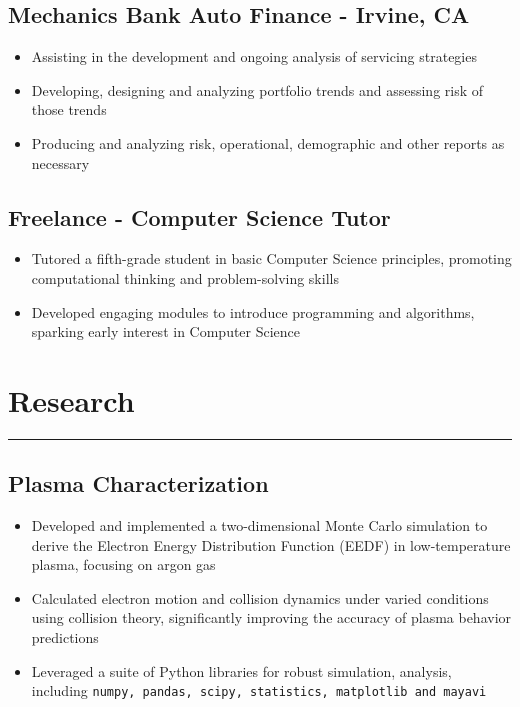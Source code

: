 \documentclass[11pt,a4paper]{article}
\newenvironment{myitemize}
{ \begin{itemize}[label={--}, leftmargin=*]
    \setlength{\itemsep}{0pt}
    \setlength{\parskip}{0pt}
    \setlength{\parsep}{0pt}     }
{ \end{itemize}                  }
\begin{document}
\subsection*{Mechanics Bank Auto Finance - Irvine, CA \hfill {} }

\begin{myitemize}
\item Assisting in the development and ongoing analysis of servicing strategies
\item Developing, designing and analyzing portfolio trends and assessing risk of those trends
\item Producing and analyzing risk, operational, demographic and other reports as necessary
\end{myitemize}


\subsection*{Freelance - Computer Science Tutor \hfill {} }

\begin{myitemize}
\item Tutored a fifth-grade student in basic Computer Science  principles, promoting computational thinking and problem-solving skills
\item Developed engaging modules to introduce programming and algorithms, sparking early interest in Computer Science
\end{myitemize}

\section*{Research}
\vspace{-3mm} %
\hrule
\vspace{3mm} %

\subsection*{Plasma Characterization \hfill {} }

\begin{myitemize}
\item Developed and implemented a two-dimensional Monte Carlo simulation to derive the Electron Energy Distribution Function (EEDF) in low-temperature plasma, focusing on argon gas
\item Calculated electron motion and collision dynamics under varied conditions using collision theory, significantly improving the accuracy of plasma behavior predictions
\item Leveraged a suite of Python libraries for robust simulation, analysis, including \texttt{numpy, pandas, scipy, statistics, matplotlib and mayavi}
\end{myitemize}
\end{document}
